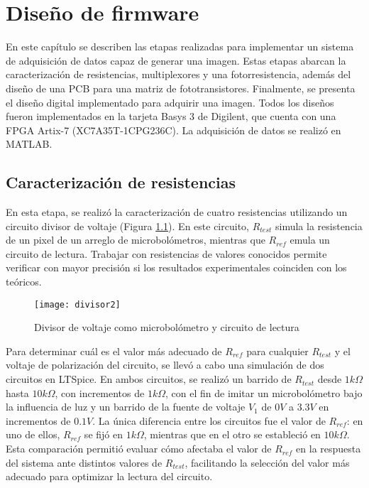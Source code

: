 \chapter{Diseño de firmware}
En este capítulo se describen las etapas realizadas para implementar un sistema de adquisición de datos capaz de generar una imagen. Estas etapas abarcan la caracterización de resistencias, multiplexores y una fotorresistencia, además del diseño de una PCB para una matriz de fototransistores. Finalmente, se presenta el diseño digital implementado para adquirir una imagen. Todos los diseños fueron implementados en la tarjeta Basys 3 de Digilent, que cuenta con una FPGA Artix-7 (XC7A35T-1CPG236C). La adquisición de datos se realizó en MATLAB.

\section{Caracterización de resistencias}
En esta etapa, se realizó la caracterización de cuatro resistencias utilizando un circuito divisor de voltaje (Figura \ref{fig:divisor2}). En este circuito, $R_{test}$ simula la resistencia de un pixel de un arreglo de microbolómetros, mientras que $R_{ref}$ emula un circuito de lectura. Trabajar con resistencias de valores conocidos permite verificar con mayor precisión si los resultados experimentales coinciden con los teóricos. 


            \begin{figure}[hbtp]
                \centering
                \texttt{[image: divisor2]}
                \caption{Divisor de voltaje como microbolómetro y circuito de lectura}
                \label{fig:divisor2}
            \end{figure} 


Para determinar cuál es el valor más adecuado de $R_{ref}$ para cualquier $R_{test}$ y el voltaje de polarización del circuito, se llevó a cabo una simulación de dos circuitos en LTSpice. En ambos circuitos, se realizó un barrido de $R_{test}$ desde $1k\Omega$ hasta $10k\Omega$, con incrementos de $1k\Omega$, con el fin de imitar un microbolómetro bajo la influencia de luz y un barrido de la fuente de voltaje $V_{1}$ de $0V$ a $3.3V$ en incrementos de $0.1V$. La única diferencia entre los circuitos fue el valor de $R_{ref}$: en uno de ellos, $R_{ref}$ se fijó en $1k\Omega$, mientras que en el otro se estableció en $10k\Omega$. Esta comparación permitió evaluar cómo afectaba el valor de $R_{ref}$ en la respuesta del sistema ante distintos valores de $R_{test}$, facilitando la selección del valor más adecuado para optimizar la lectura del circuito.


